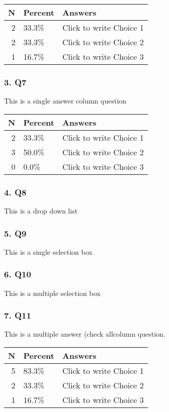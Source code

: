 \documentclass{article}\usepackage[]{graphicx}\usepackage[]{color}
\begin{document}
\begin{tabular}{r|l|l}
\hline
N & Percent & Answers\\
\hline
2 & 33.3\% & Click to write Choice 1\\
\hline
2 & 33.3\% & Click to write Choice 2\\
\hline
1 & 16.7\% & Click to write Choice 3\\
\hline
\end{tabular}


\hfill \break \hfill \break
\subsubsection*{3. Q7}
This is a single answer column question

\begin{tabular}{r|l|l}
\hline
N & Percent & Answers\\
\hline
2 & 33.3\% & Click to write Choice 1\\
\hline
3 & 50.0\% & Click to write Choice 2\\
\hline
0 & 0.0\% & Click to write Choice 3\\
\hline
\end{tabular}


\hfill \break \hfill \break
\subsubsection*{4. Q8}
This is a drop down list

\hfill \break \hfill \break
\subsubsection*{5. Q9}
This is a single selection box

\hfill \break \hfill \break
\subsubsection*{6. Q10}
This is a multiple selection box

\hfill \break \hfill \break
\subsubsection*{7. Q11}
This is a multiple answer (check allcolumn question.

\begin{tabular}{r|l|l}
\hline
N & Percent & Answers\\
\hline
5 & 83.3\% & Click to write Choice 1\\
\hline
2 & 33.3\% & Click to write Choice 2\\
\hline
1 & 16.7\% & Click to write Choice 3\\
\hline
\end{tabular}
\end{document}
